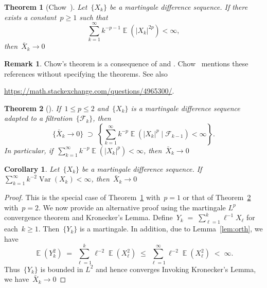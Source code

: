 \documentclass[12pt,a4paper]{article}  %
\newcounter{cite}
\newtheorem{theorem}{Theorem}[section]
\newtheorem{corollary}{Corollary}[section]
\theoremstyle{definition}
\newtheorem{remark}{Remark}[section]
\numberwithin{equation}{section}
\newcommand{\FF}{\mathcal{F}}
\newcommand{\as}{{\text{a.s.}}\xspace}
\DeclareMathOperator{\var}{Var}
\DeclareMathOperator{\expc}{\mathbb{E}}
\begin{document}
\begin{theorem}[Chow~\cite{Chow_1967}]
    \label{th:sllnmd1}
    Let~$\{X_k\}$ be a martingale difference sequence. If there exists a constant~$p\ge 1$ such that
   \[
       \sum_{k=1}^\infty k^{-p-1} \expc(|X_k|^{2p}) < \infty,
   \]
   then~$\bar{X}_k \to 0$ \as
\end{theorem}

\begin{remark}
    \label{rem:chow}
    Chow's theorem is a consequence of \cite[Theorem~2]{Chow_1960} and
    \cite[Theorem~9]{Burkholder_1966}. Chow~\cite{Chow_1967} mentions these references without
    specifying the theorems. See also
    \begin{center}
    \url{https://math.stackexchange.com/questions/4965300/}.
    \end{center}
\end{remark}

\begin{theorem}[\mbox{\cite[Theorem~2.18]{Hall_Heyde_1980}}]
    \label{th:sllnmd2}
    If~$1\le p\le 2$ and~$\{X_k\}$ is a martingale difference sequence adapted to a filtration~$\{\FF_k\}$, then
   \[
       \{\bar{X}_k \to 0\} \;\supset\; \left\{ \sum_{k=1}^\infty k^{-p} \expc(|X_k|^p
       \mathrel{|} \FF_{k-1}) < \infty \right\}.
   \]
   In particular, if~$\sum_{k=1}^\infty k^{-p} \expc(|X_k|^p) < \infty$, then~$\bar{X}_k \to 0$ \as
\end{theorem}

\begin{corollary}
    \label{coro:mdl2}
    Let~$\{X_k\}$ be a martingale difference sequence. If~$\sum_{k=1}^\infty k^{-2}\var(X_k) < \infty$,
    then~$\bar{X}_k \to 0$ \as
\end{corollary}

\begin{proof}
    This is the special case of Theorem~\ref{th:sllnmd1} with~$p=1$
    or that of Theorem~\ref{th:sllnmd2} with~$p=2$.
    We now provide an alternative proof using the martingale $L^p$ convergence theorem and
    Kronecker's Lemma.
    Define~$Y_k \;=\;  \sum_{\ell=1}^k \ell^{-1}X_\ell$ for each~$k\ge 1$. Then~$\{Y_k\}$ is
    a martingale. In addition, due to Lemma~\ref{lem:orth}, we have
    \[
        \expc(Y_k^2) \;=\; \sum_{\ell=1}^k \ell^{-2}\expc(X_\ell^2) \;\le\; \sum_{\ell=1}^\infty \ell^{-2}
        \expc(X_\ell^2) \;<\; \infty.
    \]
    Thus~$\{Y_k\}$ is bounded in $L^2$ and hence converges \as
    Invoking Kronecker's Lemma, we have~$\bar{X}_k \to 0$ \as
\end{proof}
\end{document}
